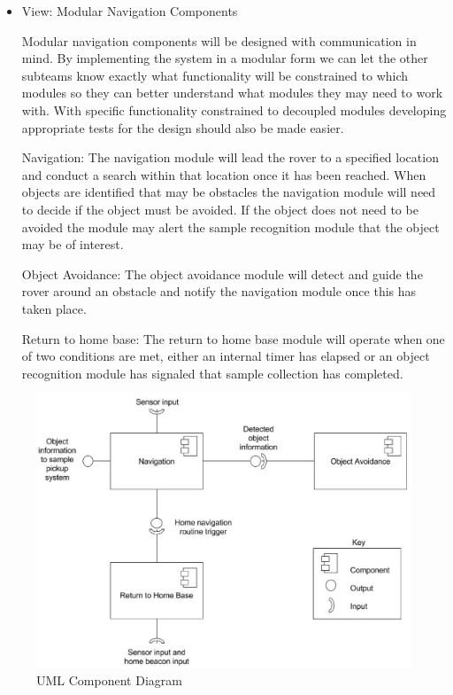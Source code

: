 \documentclass[10pt, oneside,onecolumn]{IEEEtran}
\begin{document}
\begin{itemize}

\item View: Modular Navigation Components

Modular navigation components will be designed with communication in mind. By implementing the system in a modular form we can let the other subteams know exactly what functionality will be constrained to which modules so they can better understand what modules they may need to work with. With specific functionality constrained to decoupled modules developing appropriate tests for the design should also be made easier.

\subitem Navigation: The navigation module will lead the rover to a specified location and conduct a search within that location once it has been reached. When objects are identified that may be obstacles the navigation module will need to decide if the object must be avoided. If the object does not need to be avoided the module may alert the sample recognition module that the object may be of interest.

\subitem Object Avoidance: The object avoidance module will detect and guide the rover around an obstacle and notify the navigation module once this has taken place. 

\subitem Return to home base: The return to home base module will operate when one of two conditions are met, either an internal timer has elapsed or an object recognition module has signaled that sample collection has completed.

\end{itemize}

\begin{figure}[H]
\centering
\includegraphics[width=160mm]{drawing.eps}
\caption{UML Component Diagram}
\end{figure}
\end{document}
